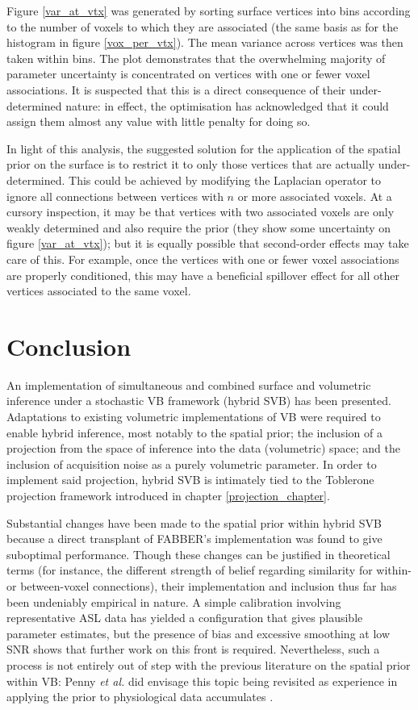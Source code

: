 \documentclass[12pt]{report}
\begin{document}
Figure \ref{var_at_vtx} was generated by sorting surface vertices into bins according to the number of voxels to which they are associated (the same basis as for the histogram in figure \ref{vox_per_vtx}). The mean variance across vertices was then taken within bins. The plot demonstrates that the overwhelming majority of parameter uncertainty is concentrated on vertices with one or fewer voxel associations. It is suspected that this is a direct consequence of their under-determined nature: in effect, the optimisation has acknowledged that it could assign them almost any value with little penalty for doing so. 

In light of this analysis, the suggested solution for the application of the spatial prior on the surface is to restrict it to only those vertices that are actually under-determined. This could be achieved by modifying the Laplacian operator to ignore all connections between vertices with $n$ or more associated voxels. At a cursory inspection, it may be that vertices with two associated voxels are only weakly determined and also require the prior (they show some uncertainty on figure \ref{var_at_vtx}); but it is equally possible that second-order effects may take care of this. For example, once the vertices with one or fewer voxel associations are properly conditioned, this may have a beneficial spillover effect for all other vertices associated to the same voxel. 

\section{Conclusion} 

An implementation of simultaneous and combined surface and volumetric inference under a stochastic VB framework (hybrid SVB) has been presented. Adaptations to existing volumetric implementations of VB were required to enable hybrid inference, most notably to the spatial prior; the inclusion of a projection from the space of inference into the data (volumetric) space; and the inclusion of acquisition noise as a purely volumetric parameter. In order to implement said projection, hybrid SVB is intimately tied to the Toblerone projection framework introduced in chapter \ref{projection_chapter}. 

Substantial changes have been made to the spatial prior within hybrid SVB because a direct transplant of FABBER's implementation was found to give suboptimal performance. Though these changes can be justified in theoretical terms (for instance, the different strength of belief regarding similarity for within- or between-voxel connections), their implementation and inclusion thus far has been undeniably empirical in nature. A simple calibration involving representative ASL data has yielded a configuration that gives plausible parameter estimates, but the presence of bias and excessive smoothing at low SNR shows that further work on this front is required. Nevertheless, such a process is not entirely out of step with the previous literature on the spatial prior within VB: Penny \textit{et al.} did envisage this topic being revisited as experience in applying the prior to physiological data accumulates \cite{Penny2005}. 
\end{document}
